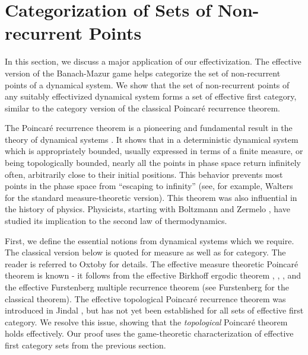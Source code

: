 \documentclass[a4paper,UKenglish,autoref,thm-restate,numberwithinsect]{lipics-v2021}
\begin{document}
\section{Categorization of Sets of Non-recurrent Points}

In this section, we discuss a major application of our effectivization. The effective version of the Banach-Mazur game helps categorize the set of non-recurrent points of a dynamical system. We show that the set of non-recurrent points of any suitably effectivized dynamical system forms a set of effective first category, similar to the category version of the classical Poincar\'e recurrence theorem. 


The Poincar\'{e} recurrence theorem is a pioneering and fundamental result in the theory of dynamical systems \cite{Poincare1899}. It shows that in a deterministic dynamical system which is appropriately bounded, usually expressed in terms of a finite measure, or being topologically bounded, nearly all the points in phase space return infinitely often, arbitrarily close to their initial positions. This behavior prevents most points in the phase space from ``escaping to infinity'' (see, for example, Walters \cite{Walters1982} for the standard measure-theoretic version). This theorem was also influential in the history of physics. Physicists, starting with Boltzmann \cite{Boltzmann1896} and Zermelo \cite{Zermelo1896}, have studied its implication to the second law of thermodynamics. 


First, we define the essential notions from dynamical systems which we require. The classical version below is quoted for measure as well as for category. The reader is referred to Oxtoby \cite{Oxtoby1980} for details. The effective measure theoretic Poincar\'{e} theorem is known - it follows from the effective Birkhoff ergodic theorem \cite{Vyugin1997}, \cite{Nandakumar2008}, \cite{Hoyrup2009b}, \cite{Vijayvargiya2014} and the effective Furstenberg multiple recurrence theorem \cite{Downey2019a} (see Furstenberg \cite{Furstenberg1981} for the classical theorem). The effective topological Poincar\'{e} recurrence theorem was introduced in Jindal \cite{Jindal2014}, but has not yet been established for all sets of effective first category. We resolve this issue, showing that the \emph{topological} Poincar\'{e} theorem holds effectively. Our proof uses the game-theoretic characterization of effective first category sets from the previous section. 
\end{document}
